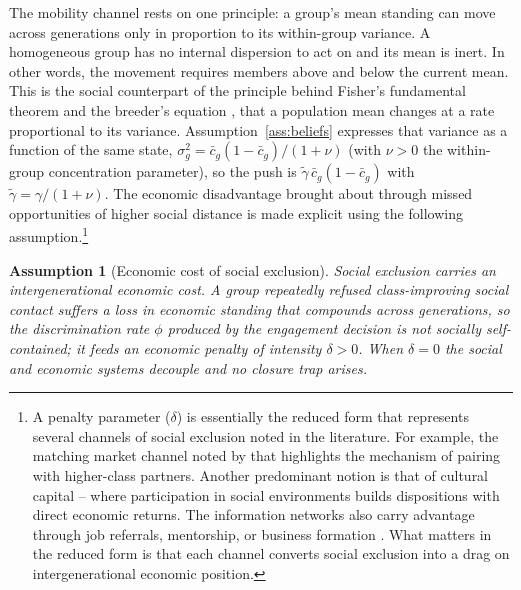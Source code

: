 \documentclass[pdflatex,sn-basic]{sn-jnl}
\theoremstyle{thmstyleone}
\newtheorem{assumption}{Assumption}
\numberwithin{proposition}{subsection}
\begin{document}
The mobility channel rests on one principle: a group's mean standing can
move across generations only in proportion to its within-group variance.
A homogeneous group has no internal dispersion to act on and its mean is
inert. In other words, the movement requires members above and below the current mean. This
is the social counterpart of the principle behind Fisher's fundamental
theorem and the breeder's equation \citep{Fisher1930}, that a population
mean changes at a rate proportional to its variance. Assumption~\ref{ass:beliefs}
expresses that variance as a function of the same state,
$\sigma_g^2 = \bar{c}_g(1-\bar{c}_g)/(1+\nu)$ (with $\nu > 0$ the
within-group concentration parameter), so the push is
$\tilde{\gamma}\,\bar{c}_g(1-\bar{c}_g)$ with $\tilde{\gamma} = \gamma/(1+\nu)$. The economic disadvantage brought about through missed opportunities of higher social distance is made explicit using the following assumption.\footnote{A penalty parameter ($\delta$) is essentially the reduced
form that represents several channels of social exclusion noted in the
literature. For example, the matching market channel noted by
\citet{ColeMailathPostlewaite1992} that highlights the mechanism of
pairing with higher-class partners. Another predominant notion is that of
cultural capital \citep{Bourdieu1984} -- where participation in social
environments builds dispositions with direct economic returns. The
information networks also carry advantage through job referrals,
mentorship, or business formation \citep{Granovetter1973}. What matters in
the reduced form is that each channel converts social exclusion into a
drag on intergenerational economic position.}

\begin{assumption}[Economic cost of social exclusion]
\label{ass:exclusion-cost}
Social exclusion carries an intergenerational economic cost. A group
repeatedly refused class-improving social contact suffers a loss in
economic standing that compounds across generations, so the
discrimination rate $\phi$ produced by the engagement decision is not
socially self-contained; it feeds an economic penalty of intensity
$\delta > 0$. When $\delta = 0$ the social and economic systems decouple
and no closure trap arises.
\end{assumption}
\end{document}
